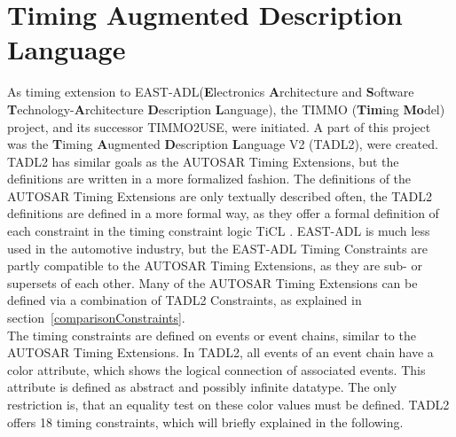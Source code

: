 \newpage

\section{Timing Augmented Description Language}
	As timing extension to EAST-ADL(\textbf{E}lectronics \textbf{A}rchitecture and \textbf{S}oftware \textbf{T}echnology-\textbf{A}rchitecture \textbf{D}escription \textbf{L}anguage), the TIMMO (\textbf{Tim}ing \textbf{Mo}del) project, and its successor TIMMO2USE, were initiated. A part of this project was the \textbf{T}iming \textbf{A}ugmented \textbf{D}escription \textbf{L}anguage V2 (TADL2), were created. TADL2 has similar goals as the AUTOSAR Timing Extensions, but the definitions are written in a more formalized fashion. The definitions of the AUTOSAR Timing Extensions are only textually described often, the TADL2 definitions are defined in a more formal way, as they offer a formal definition of each constraint in the timing constraint logic TiCL \cite{TIMMO2USE}. EAST-ADL is much less used in the automotive industry, but the EAST-ADL Timing Constraints are partly compatible to the AUTOSAR Timing Extensions, as they are sub- or supersets of each other. Many of the AUTOSAR Timing Extensions can be defined via a combination of TADL2 Constraints, as explained in section~\ref{comparisonConstraints}.\\
	The timing constraints are defined on events or event chains, similar to the AUTOSAR Timing Extensions. In TADL2, all events of an event chain have a color attribute, which shows the logical connection of associated events. This attribute is defined as abstract and possibly infinite datatype. The only restriction is, that an equality test on these color values must be defined. TADL2 offers 18 timing constraints, which will briefly explained in the following.
